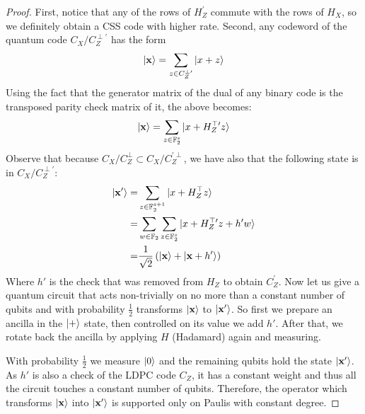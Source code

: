 \documentclass[manuscript,screen,review]{acmart}
\begin{document}
\begin{proof}
First, notice that any of the rows of $H_Z^{\prime}$ commute with the rows of $H_X$, so we definitely obtain a CSS code with higher rate. Second, any codeword of the quantum code $C_X/C_Z^{\perp \prime}$ has the form  
\begin{equation*}
  \begin{split}
    \ket{\mathbf{x}} = \sum_{z \in C_Z^{\perp \prime}}{\ket{x + z}}
  \end{split}
\end{equation*}
Using the fact that the generator matrix of the dual of any binary code is the transposed parity check matrix of it, the above becomes:
\begin{equation*}
  \begin{split}
    \ket{\mathbf{x}} = \sum_{z \in \mathbb{F}_2^s}{\ket{x + H_Z^{\top \prime}z}}
  \end{split}
\end{equation*}
Observe that because $C_X/C_Z^{\perp} \subset C_X/C_Z^{\prime \perp}$, we have also that the following state is in $C_X/C_Z^{\perp \prime}$:
\begin{equation*}
  \begin{split} 
    \ket{\mathbf{x'}} = & \sum_{z \in \mathbb{F}_2^{s+1}}{\ket{x + H_Z^{\top}z}} \\
    =& \sum_{w \in \mathbb{F}_2}\sum_{z \in \mathbb{F}_2^s}{\ket{x + H_Z^{\top \prime}z + h'w  }} \\ 
    =& \frac{1}{\sqrt{2}}\left( \ket{\mathbf{x}} + \ket{\mathbf{x} + h^{\prime}} \right)
  \end{split}
\end{equation*}
Where $h'$ is the check that was removed from $H_Z$ to obtain $C_Z^{\prime}$. Now let us give a quantum circuit that acts non-trivially on no more than a constant number of qubits and with probability $\frac{1}{2}$ transforms $\ket{\mathbf{x}}$ to $\ket{\mathbf{x'}}$. So first we prepare an ancilla in the $\ket{+}$ state, then controlled on its value we add $h'$. After that, we rotate back the ancilla by applying $H$ (Hadamard) again and measuring.

With probability $\frac{1}{2}$ we measure $\ket{0}$ and the remaining qubits hold the state $\ket{\mathbf{x'}}$. As $h'$ is also a check of the LDPC code $C_Z$, it has a constant weight and thus all the circuit touches a constant number of qubits. Therefore, the operator which transforms $\ket{\mathbf{x}}$ into $\ket{\mathbf{x'}}$ is supported only on Paulis with constant degree.     
\end{proof}  

% 

\printbibliography
\end{document}
